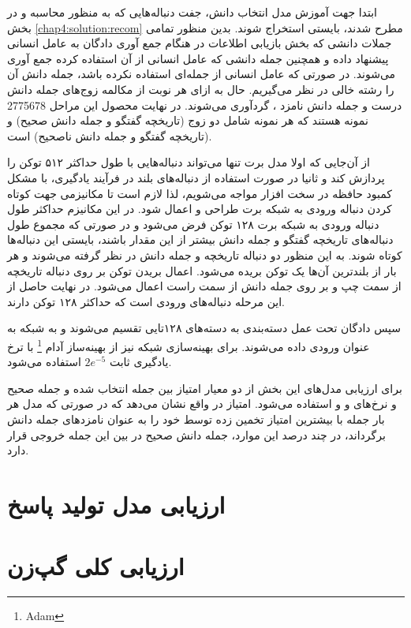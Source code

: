  ابتدا جهت آموزش مدل انتخاب دانش،‌ جفت دنباله‌هایی که به منظور محاسبه 
 و
 در بخش 
 \ref{chap4:solution:recom}
 مطرح شدند، بایستی استخراج شوند. بدین منظور تمامی جملات دانشی که بخش بازیابی اطلاعات در هنگام جمع آوری دادگان به عامل انسانی پیشنهاد داده و همچنین جمله دانشی که عامل انسانی از آن استفاده کرده جمع آوری می‌شوند. در صورتی که عامل انسانی از جمله‌ای استفاده نکرده باشد،‌ جمله دانش آن را رشته خالی در نظر می‌گیریم. حال به ازای هر نوبت از مکالمه زوج‌های جمله دانش درست و جمله دانش نامزد ، گردآوری می‌شوند. در نهایت محصول این مراحل 2775678 نمونه هستند که هر نمونه شامل دو زوج (تاریخچه گفتگو و جمله دانش صحیح) و (تاریخچه گفتگو و جمله دانش ناصحیح) است. 
 

از آن‌جایی که اولا مدل برت تنها می‌تواند دنباله‌هایی با طول حداکثر ۵۱۲ توکن را پردازش کند و ثانیا در صورت استفاده از دنباله‌های بلند در فرآیند یادگیری، با مشکل کمبود حافظه در سخت افزار مواجه می‌شویم، لذا لازم است تا مکانیزمی جهت کوتاه کردن دنباله ورودی به شبکه برت طراحی و اعمال شود. در این مکانیزم حداکثر طول دنباله ورودی به شبکه برت ۱۲۸ توکن فرض می‌شود و در صورتی که مجموع طول دنباله‌های تاریخچه گفتگو و جمله دانش بیشتر از این مقدار باشند، بایستی این دنباله‌ها کوتاه شوند. به این منظور دو دنباله تاریخچه و جمله دانش در نظر گرفته می‌شوند و هر بار از بلندترین آن‌ها یک توکن بریده می‌شود. اعمال بریدن توکن بر روی دنباله تاریخچه از سمت چپ و بر روی جمله دانش از سمت راست اعمال می‌شود. در نهایت حاصل از این مرحله دنباله‌های ورودی است که حداکثر ۱۲۸ توکن دارند. 

سپس دادگان تحت عمل دسته‌بندی به دسته‌های ۱۲۸تایی تقسیم می‌شوند و به شبکه به عنوان ورودی داده می‌شوند. برای بهینه‌سازی شبکه نیز از بهینه‌ساز آدام
\footnote{Adam}
با ترخ یادگیری ثابت 
$2e^{-5}$
استفاده می‌شود.

برای ارزیابی مدل‌های این بخش از دو معیار امتیاز
بین جمله انتخاب شده و جمله صحیح
و نرخ‌های 
 و  و 
استفاده می‌شود. امتیاز
در واقع نشان می‌دهد که در صورتی که مدل هر بار 
جمله  با بیشترین امتیاز تخمین زده توسط خود را به عنوان نامزد‌های جمله دانش برگرداند، در چند درصد این موارد، جمله دانش صحیح در بین این 
جمله خروجی قرار دارد. 



\section{ارزیابی مدل تولید پاسخ}


\section{ارزیابی کلی گپ‌زن}